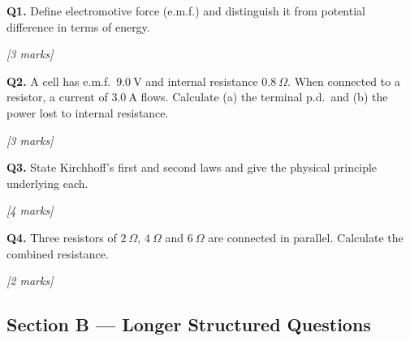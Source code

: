 \begin{tcolorbox}[colback=white, colframe=midblue, breakable]

\begin{minipage}{\linewidth}
\textbf{Q1.} Define electromotive force (e.m.f.) and distinguish it from potential difference in terms of energy.
\par\hfill\textit{[3 marks]}
\vspace{3cm}
\end{minipage}

\begin{minipage}{\linewidth}
\textbf{Q2.} A cell has e.m.f.\ $9.0\ \text{V}$ and internal resistance $0.8\ \Omega$. When connected to a resistor, a current of $3.0\ \text{A}$ flows. Calculate (a) the terminal p.d.\ and (b) the power lost to internal resistance.
\par\hfill\textit{[3 marks]}
\vspace{3cm}
\end{minipage}

\begin{minipage}{\linewidth}
\textbf{Q3.} State Kirchhoff's first and second laws and give the physical principle underlying each.
\par\hfill\textit{[4 marks]}
\vspace{3.5cm}
\end{minipage}

\begin{minipage}{\linewidth}
\textbf{Q4.} Three resistors of $2\ \Omega$, $4\ \Omega$ and $6\ \Omega$ are connected in parallel. Calculate the combined resistance.
\par\hfill\textit{[2 marks]}
\vspace{2.5cm}
\end{minipage}

\end{tcolorbox}

\pagebreak

\subsection*{Section B — Longer Structured Questions}

